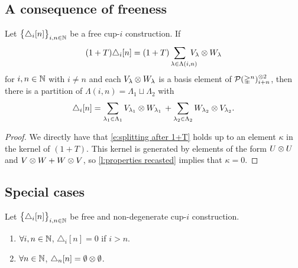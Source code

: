 
\subsection{A consequence of freeness}

\begin{lemma} \label{l:splitting of summands}
	Let $\big\{ \triangle_i [n] \big\}_{i,n\in\mathbb{N}}$ be a free \mbox{cup-$i$} construction.
	If
	\[
	(1+T) \triangle_i [n] =
	(1+T) \sum_{\lambda \in \Lambda(i,n) \kern-10pt} V_\lambda \ot W_\lambda
	\]
	for $i,n \in \mathbb{N}$ with $i \neq n$ and each $V_\lambda \otimes W_\lambda$ is a basis element of $\mathcal{P}(\mathbb{\Delta}^n)^{\otimes 2}_{i+n}$, then there is a partition of $\Lambda(i,n) = \Lambda_1 \sqcup \Lambda_2$ with
	\begin{equation} \label{e:splitting after 1+T}
	\triangle_i [n] =
	\sum_{\lambda_1 \in \Lambda_1} V_{\lambda_1} \otimes W_{\lambda_1} \, +
	\sum_{\lambda_2 \in \Lambda_2} W_{\lambda_2} \otimes V_{\lambda_2}.
	\end{equation}
\end{lemma}

\begin{proof}
	We directly have that \eqref{e:splitting after 1+T} holds up to an element $\kappa$ in the kernel of $(1+T)$.
	This kernel is generated by elements of the form $U \otimes U$ and $V \otimes W + W \otimes V$, so \cref{l:properties recasted} implies that $\kappa = 0$.
\end{proof}

\subsection{Special cases}

\begin{lemma} \label{l:special case one}
	Let $\big\{ \triangle_i [n] \big\}_{i,n\in\mathbb{N}}$ be free and non-degenerate \mbox{cup-$i$} construction.
	\begin{enumerate}
		\item $\forall i,n \in \mathbb{N}$, $\triangle_i[n] = 0$ if $i > n$.
		\item $\forall n \in \mathbb{N}$, $\triangle_n[n] = \emptyset \otimes \emptyset$.
	\end{enumerate}
\end{lemma}

